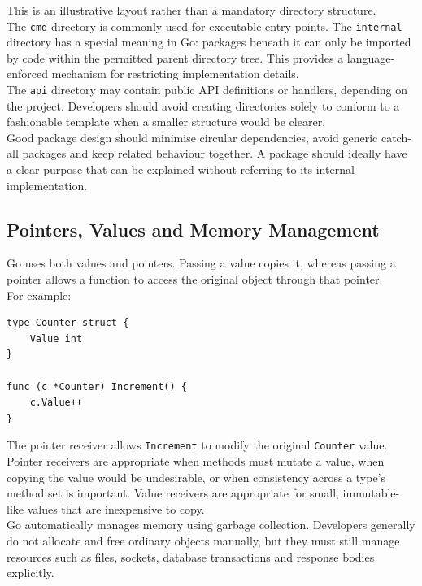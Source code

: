 This is an illustrative layout rather than a mandatory directory structure.\\

The \texttt{cmd} directory is commonly used for executable entry points. The \texttt{internal} directory has a special meaning in Go: packages beneath it can only be imported by code within the permitted parent directory tree. This provides a language-enforced mechanism for restricting implementation details.\\

The \texttt{api} directory may contain public API definitions or handlers, depending on the project. Developers should avoid creating directories solely to conform to a fashionable template when a smaller structure would be clearer.\\

Good package design should minimise circular dependencies, avoid generic catch-all packages and keep related behaviour together. A package should ideally have a clear purpose that can be explained without referring to its internal implementation.\\

\subsection{Pointers, Values and Memory Management}

Go uses both values and pointers. Passing a value copies it, whereas passing a pointer allows a function to access the original object through that pointer.\\

For example:

\begin{lstlisting}
type Counter struct {
    Value int
}

func (c *Counter) Increment() {
    c.Value++
}
\end{lstlisting}

The pointer receiver allows \texttt{Increment} to modify the original \texttt{Counter} value.\\

Pointer receivers are appropriate when methods must mutate a value, when copying the value would be undesirable, or when consistency across a type's method set is important. Value receivers are appropriate for small, immutable-like values that are inexpensive to copy.\\

Go automatically manages memory using garbage collection. Developers generally do not allocate and free ordinary objects manually, but they must still manage resources such as files, sockets, database transactions and response bodies explicitly.\\

